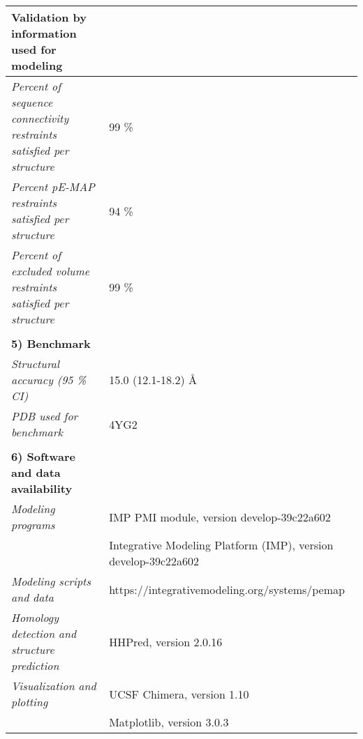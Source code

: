 \documentclass[8pt,a4paper]{article}
\begin{document}
\begin{longtable}{ p{} | p{} }
  \textbf{Validation by information used for modeling} & \\
  \hline
          \textit{Percent of sequence connectivity restraints satisfied per structure} & 99 \%\\
                \textit{Percent pE-MAP restraints satisfied per structure} & 94 \%\\
                \textit{Percent of excluded volume restraints satisfied per structure} & 99 \%\\
          &  \\
  
  \textbf{5) Benchmark} & \\
  \hline
          \textit{Structural accuracy (95 \% CI)} & 15.0 (12.1-18.2) \AA\\
                \textit{PDB used for benchmark} & 4YG2\\
          
   &  \\
  \normalsize{\textbf{6) Software and data availability}} & \\
    \hline
             \textit{Modeling programs} & IMP PMI module, version develop-39c22a602\\
             & Integrative Modeling Platform (IMP), version develop-39c22a602 \\
                  \textit{Modeling scripts and data} & https://integrativemodeling.org/systems/pemap\\
                  \textit{Homology detection and structure prediction} & HHPred, version 2.0.16\\
                  \textit{Visualization and plotting} & UCSF Chimera, version 1.10\\
             & Matplotlib, version 3.0.3  \\
          \hline

  
\end{longtable}
\end{document}
